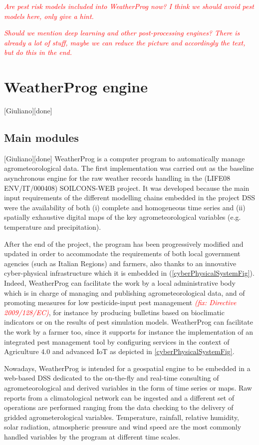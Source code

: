 \documentclass[authoryear,preprint,review,12pt]{elsarticle}
\newcommand{\note}[1]{\emph{\textcolor{red}{#1}}}
\begin{document}
\note{Are pest risk models included into WeatherProg now? I think we should avoid pest models here, only give a hint.}

\note{Should we mention deep learning and other post-processing engines? There is already a lot of stuff, maybe we can reduce the picture and accordingly the text, but do this in the end.}

\section{WeatherProg engine}[Giuliano][done] \label{sec:weatherprog}
\subsection{Main modules}[Giuliano][done]
WeatherProg \citep{langella:weatherprog2014} is a computer program to automatically manage agrometeorological data.
The first implementation was carried out as the baseline asynchronous engine for the raw weather records handling in the (LIFE08 ENV/IT/000408) SOILCONS-WEB project.
It was developed because the main input requirements of the different modelling chains embedded in the project DSS \citep{Terribile:soilconsweb:2015} were the availability of both (i) complete and homogeneous time series and (ii) spatially exhaustive digital maps of the key agrometeorological variables (e.g. temperature and precipitation).

After the end of the project, the program has been progressively modified and updated in order to accommodate the requirements of both local government agencies (such as Italian Regions) and farmers, also thanks to an innovative cyber-physical infrastructure which it is embedded in (\cref{cyberPhysicalSystemFig}).
Indeed, WeatherProg can facilitate the work by a local administrative body which is in charge of managing and publishing agrometeorological data, and of promoting measures for low pesticide-input pest management \note{(fix: Directive 2009/128/EC)\citep{eu:dir128:2009}}, for instance by producing bulletins based on bioclimatic indicators or on the results of pest simulation models.
WeatherProg can facilitate the work by a farmer too, since it supports for instance the implementation of an integrated pest management tool \citep{Terribile:dssvitis:2017} by configuring services in the context of Agriculture 4.0 and advanced IoT as depicted in \cref{cyberPhysicalSystemFig}.

Nowadays, WeatherProg is intended for a geospatial engine to be embedded in a web-based DSS dedicated to the on-the-fly and real-time consulting of agrometeorological and derived variables in the form of time series or maps.
Raw reports from a climatological network can be ingested and a different set of operations are performed ranging from the data checking to the delivery of gridded agrometerological variables.
Temperature, rainfall, relative humidity, solar radiation, atmospheric pressure and wind speed are the most commonly handled variables by the program at different time scales.
\end{document}
